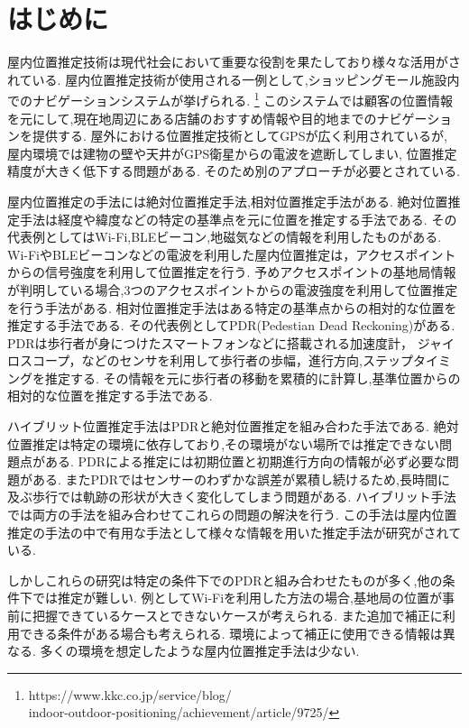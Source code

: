 
\section{はじめに}
屋内位置推定技術は現代社会において重要な役割を果たしており様々な活用がされている.
屋内位置推定技術が使用される一例として,ショッピングモール施設内でのナビゲーションシステムが挙げられる.
\footnote{https://www.kkc.co.jp/service/blog/\\indoor-outdoor-positioning/achievement/article/9725/}
このシステムでは顧客の位置情報を元にして,現在地周辺にある店舗のおすすめ情報や目的地までのナビゲーションを提供する.
屋外における位置推定技術としてGPSが広く利用されているが,
屋内環境では建物の壁や天井がGPS衛星からの電波を遮断してしまい,
位置推定精度が大きく低下する問題がある.
そのため別のアプローチが必要とされている.

屋内位置推定の手法には絶対位置推定手法,相対位置推定手法がある.
絶対位置推定手法は経度や緯度などの特定の基準点を元に位置を推定する手法である.
その代表例としてはWi-Fi,BLEビーコン,地磁気などの情報を利用したものがある.
Wi-FiやBLEビーコンなどの電波を利用した屋内位置推定は，アクセスポイントからの信号強度を利用して位置推定を行う.
予めアクセスポイントの基地局情報が判明している場合,3つのアクセスポイントからの電波強度を利用して位置推定を行う手法がある.
相対位置推定手法はある特定の基準点からの相対的な位置を推定する手法である.
その代表例としてPDR(Pedestian Dead Reckoning)がある.
PDRは歩行者が身につけたスマートフォンなどに搭載される加速度計，
ジャイロスコープ，などのセンサを利用して歩行者の歩幅，進行方向,ステップタイミングを推定する.
その情報を元に歩行者の移動を累積的に計算し,基準位置からの相対的な位置を推定する手法である.

ハイブリット位置推定手法はPDRと絶対位置推定を組み合わた手法である.
絶対位置推定は特定の環境に依存しており,その環境がない場所では推定できない問題点がある.
PDRによる推定には初期位置と初期進行方向の情報が必ず必要な問題がある.
またPDRではセンサーのわずかな誤差が累積し続けるため,長時間に及ぶ歩行では軌跡の形状が大きく変化してしまう問題がある.
ハイブリット手法では両方の手法を組み合わせてこれらの問題の解決を行う.
この手法は屋内位置推定の手法の中で有用な手法として様々な情報を用いた推定手法が研究がされている.

しかしこれらの研究は特定の条件下でのPDRと組み合わせたものが多く,他の条件下では推定が難しい.
例としてWi-Fiを利用した方法の場合,基地局の位置が事前に把握できているケースとできないケースが考えられる.
また追加で補正に利用できる条件がある場合も考えられる.
環境によって補正に使用できる情報は異なる.
多くの環境を想定したような屋内位置推定手法は少ない.


